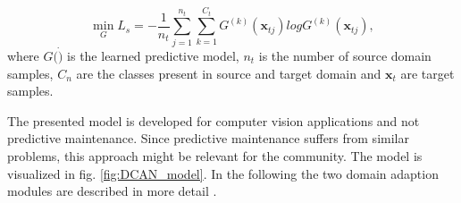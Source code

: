 \begin{equation}
    \min_{G} L_{s} = -\frac{1}{n_{t}} \sum_{j=1}^{n_{t}} \sum_{k=1}^{C_{t}} G^{(k)}(\pmb{x}_{tj})logG^{(k)}(\pmb{x}_{tj}),
\end{equation}
where $G(\dot)$ is the learned predictive model, $n_{t}$ is the number of source domain samples, $C_{n}$ are the classes present in source and target domain and $\pmb{x}_{t}$ are target samples.


The presented model is developed for computer vision applications and not predictive maintenance. Since predictive maintenance suffers from similar problems, this approach might be relevant for the community. The model is visualized in fig. \ref{fig:DCAN_model}. In the following the two domain adaption modules are described in more detail \cite{li2020}. 

